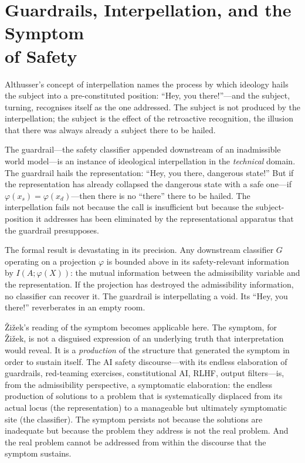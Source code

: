 \documentclass[10pt,a4paper]{article}
\begin{document}
\section{Guardrails, Interpellation, and the Symptom\\
of Safety}

Althusser's \citeyearpar{althusser1971ideology} concept of interpellation names
the process by which ideology hails the subject into a pre-constituted position:
``Hey, you there!''---and the subject, turning, recognises itself as the one
addressed. The subject is not produced by the interpellation; the subject is
the effect of the retroactive recognition, the illusion that there was always
already a subject there to be hailed.

The guardrail---the safety classifier appended downstream of an inadmissible
world model---is an instance of ideological interpellation in the
\emph{technical} domain. The guardrail hails the representation: ``Hey, you
there, dangerous state!'' But if the representation has already collapsed the
dangerous state with a safe one---if $\varphi(x_s) = \varphi(x_d)$---then
there is no ``there'' there to be hailed. The interpellation fails not
because the call is insufficient but because the subject-position it addresses
has been eliminated by the representational apparatus that the guardrail
presupposes.

The formal result is devastating in its precision. Any downstream classifier
$G$ operating on a projection $\varphi$ is bounded above in its
safety-relevant information by $I(A;\varphi(X))$: the mutual information
between the admissibility variable and the representation. If the projection
has destroyed the admissibility information, no classifier can recover it.
The guardrail is interpellating a void. Its ``Hey, you there!'' reverberates
in an empty room.

Žižek's reading of the symptom becomes applicable here. The symptom, for Žižek,
is not a disguised expression of an underlying truth that interpretation would
reveal. It is a \emph{production} of the structure that generated the symptom
in order to sustain itself. The AI safety discourse---with its endless
elaboration of guardrails, red-teaming exercises, constitutional AI, RLHF,
output filters---is, from the admissibility perspective, a symptomatic
elaboration: the endless production of solutions to a problem that is
systematically displaced from its actual locus (the representation) to a
manageable but ultimately symptomatic site (the classifier). The symptom
persists not because the solutions are inadequate but because the problem
they address is not the real problem. And the real problem cannot be addressed
from within the discourse that the symptom sustains.
\end{document}
